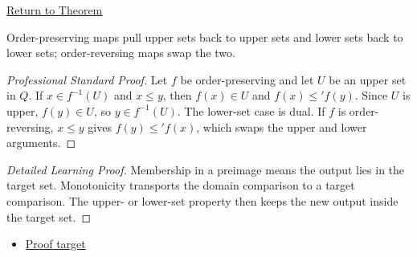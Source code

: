 \newpage
{}
\label{prf:preimage-upper-lower-sets}

\begin{remark*}[Return]
\hyperref[thm:preimage-upper-lower-sets]{Return to Theorem}
\end{remark*}

\begin{theorem*}
Order-preserving maps pull upper sets back to upper sets and lower sets back
to lower sets; order-reversing maps swap the two.
\end{theorem*}

\begin{proof}[Professional Standard Proof]
\LRAProofBodyStart
Let $f$ be order-preserving and let $U$ be an upper set in $Q$. If
$x\in f^{-1}(U)$ and $x\leq y$, then $f(x)\in U$ and
$f(x)\leq' f(y)$. Since $U$ is upper, $f(y)\in U$, so $y\in f^{-1}(U)$.
The lower-set case is dual. If $f$ is order-reversing, $x\leq y$ gives
$f(y)\leq' f(x)$, which swaps the upper and lower arguments.
\end{proof}

\begin{proof}[Detailed Learning Proof]
\LRAProofBodyStart
Membership in a preimage means the output lies in the target set. Monotonicity
transports the domain comparison to a target comparison. The upper- or
lower-set property then keeps the new output inside the target set.
\end{proof}
\begin{remark*}
\end{remark*}



\begin{dependencies}
\begin{itemize}
  \item \hyperref[thm:preimage-upper-lower-sets]{Proof target}
\end{itemize}
\end{dependencies}

\clearpage

